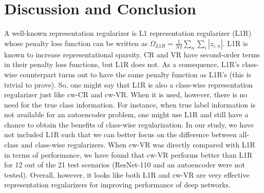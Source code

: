\section{Discussion and Conclusion}
A well-known representation regularizer is L1 representation regularizer (L1R) whose penalty loss function can be written as ${\Omega}_{L1R}=\frac{1}{NI}\sum_n \sum_i |z_{i,n}|$. L1R is known to increase representational sparsity. CR and VR have second-order terms in their penalty loss functions, but L1R does not. As a consequence, L1R's class-wise counterpart turns out to have the same penalty function as L1R's (this is trivial to prove). So, one might say that L1R is also a class-wise representation regularizer just like cw-CR and cw-VR. When it is used, however, there is no need for the true class information. For instance, when true label information is not available for an autoencoder problem, one might use L1R and still have a chance to obtain the benefits of class-wise regularization. In our study, we have not included L1R such that we can better focus on the difference between all-class and class-wise regularizers. When cw-VR was directly compared with L1R in terms of performance, we have found that cw-VR performs better than L1R for 12 out of the 21 test scenarios (ResNet-110 and an autoencoder were not tested). Overall, however, it looks like both L1R and cw-VR are very effective representation regularizers for improving performance of deep networks. 

